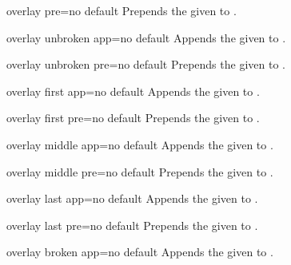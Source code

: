 \begin{docTcbKey}{overlay pre}{=}{no default}
  Prepends the given  to .
\end{docTcbKey}

\begin{docTcbKey}{overlay unbroken app}{=}{no default}
  Appends the given  to .
\end{docTcbKey}

\begin{docTcbKey}{overlay unbroken pre}{=}{no default}
  Prepends the given  to .
\end{docTcbKey}

\begin{docTcbKey}{overlay first app}{=}{no default}
  Appends the given  to .
\end{docTcbKey}

\begin{docTcbKey}{overlay first pre}{=}{no default}
  Prepends the given  to .
\end{docTcbKey}

\clearpage
\begin{docTcbKey}{overlay middle app}{=}{no default}
  Appends the given  to .
\end{docTcbKey}

\begin{docTcbKey}{overlay middle pre}{=}{no default}
  Prepends the given  to .
\end{docTcbKey}

\begin{docTcbKey}{overlay last app}{=}{no default}
  Appends the given  to .
\end{docTcbKey}

\begin{docTcbKey}{overlay last pre}{=}{no default}
  Prepends the given  to .
\end{docTcbKey}

\begin{docTcbKey}{overlay broken app}{=}{no default}
  Appends the given  to .
\end{docTcbKey}

